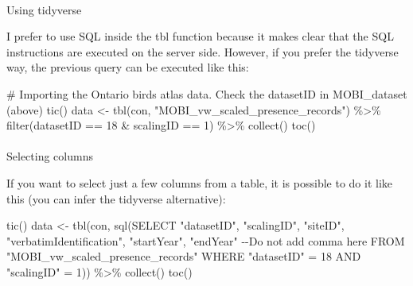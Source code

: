 \documentclass[
  letterpaper,
  DIV=11,
  numbers=noendperiod]{scrartcl}
\makeatletter
\let\oldparagraph\paragraph
\renewcommand{\paragraph}{
    \@ifstar
      \xxxParagraphStar
      \xxxParagraphNoStar
  }
\newcommand{\xxxParagraphStar}[1]{\oldparagraph*{#1}\mbox{}}
\newcommand{\xxxParagraphNoStar}[1]{\oldparagraph{#1}\mbox{}}
\newenvironment{Shaded}{\begin{snugshade}}{\end{snugshade}}
\newcommand{\CommentTok}[1]{\textcolor[rgb]{0.37,0.37,0.37}{#1}}
\newcommand{\DecValTok}[1]{\textcolor[rgb]{0.68,0.00,0.00}{#1}}
\newcommand{\FunctionTok}[1]{\textcolor[rgb]{0.28,0.35,0.67}{#1}}
\newcommand{\NormalTok}[1]{\textcolor[rgb]{0.00,0.23,0.31}{#1}}
\newcommand{\OtherTok}[1]{\textcolor[rgb]{0.00,0.23,0.31}{#1}}
\newcommand{\SpecialCharTok}[1]{\textcolor[rgb]{0.37,0.37,0.37}{#1}}
\newcommand{\StringTok}[1]{\textcolor[rgb]{0.13,0.47,0.30}{#1}}
\makeatother
\begin{document}
\paragraph{Using tidyverse}\label{using-tidyverse}

I prefer to use SQL inside the tbl function because it makes clear that
the SQL instructions are executed on the server side. However, if you
prefer the tidyverse way, the previous query can be executed like this:

\begin{Shaded}
\begin{Highlighting}[]
\CommentTok{\# Importing the Ontario birds atlas data. Check the datasetID in MOBI\_dataset (above)}
\FunctionTok{tic}\NormalTok{()}
\NormalTok{data }\OtherTok{\textless{}{-}} \FunctionTok{tbl}\NormalTok{(con, }\StringTok{"MOBI\_vw\_scaled\_presence\_records"}\NormalTok{) }\SpecialCharTok{\%\textgreater{}\%}
  \FunctionTok{filter}\NormalTok{(datasetID }\SpecialCharTok{==} \DecValTok{18} \SpecialCharTok{\&}\NormalTok{ scalingID }\SpecialCharTok{==} \DecValTok{1}\NormalTok{) }\SpecialCharTok{\%\textgreater{}\%}
  \FunctionTok{collect}\NormalTok{()}
\FunctionTok{toc}\NormalTok{()}
\end{Highlighting}
\end{Shaded}

\paragraph{Selecting columns}\label{selecting-columns}

If you want to select just a few columns from a table, it is possible to
do it like this (you can infer the tidyverse alternative):

\begin{Shaded}
\begin{Highlighting}[]
\FunctionTok{tic}\NormalTok{()}
\NormalTok{data }\OtherTok{\textless{}{-}} \FunctionTok{tbl}\NormalTok{(con, }\FunctionTok{sql}\NormalTok{(}\StringTok{\textquotesingle{}SELECT}
\StringTok{                     "datasetID",}
\StringTok{                     "scalingID",}
\StringTok{                     "siteID",}
\StringTok{                     "verbatimIdentification",}
\StringTok{                     "startYear",}
\StringTok{                     "endYear" {-}{-}Do not add comma here}
\StringTok{                     FROM "MOBI\_vw\_scaled\_presence\_records"}
\StringTok{                      WHERE "datasetID" = 18}
\StringTok{                      AND "scalingID" = 1\textquotesingle{}}\NormalTok{)) }\SpecialCharTok{\%\textgreater{}\%}
  \FunctionTok{collect}\NormalTok{()}
\FunctionTok{toc}\NormalTok{()}
\end{Highlighting}
\end{Shaded}
\end{document}
